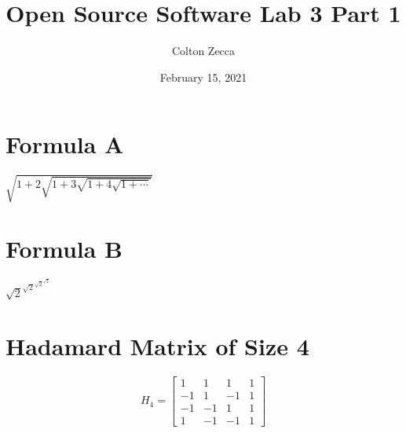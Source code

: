 \documentclass{article}
\title{Open Source Software Lab 3 Part 1}
\author{Colton Zecca}
\date{February 15, 2021}
\begin{document}
\maketitle

\section{Formula A}
$\sqrt{1+2 \sqrt{1+3 \sqrt{1+4 \sqrt{1+\cdots}}}}$

\section{Formula B}
$\sqrt{2}^{\sqrt{2}^{\sqrt{2}^{\sqrt{2}\cdots}}}$

\section{Hadamard Matrix of Size 4}

$$H_4=\begin{bmatrix}
1 & 1 & 1 & 1 \\
-1 & 1 & -1 & 1 \\
-1 & -1 & 1 & 1 \\
1 & -1 & -1 & 1
\end{bmatrix}$$
\end{document}
